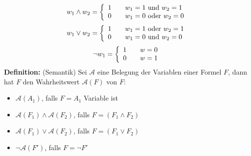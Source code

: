 \documentclass[a4paper]{scrartcl}
\begin{document}
\[ w_1 \wedge w_2 = \left\{
  \begin{array}{l l}
    1 & \quad \text{$w_1 = 1$ und $w_2 = 1$}\\
    0 & \quad \text{$w_1 = 0$ oder $w_2 = 0$}
  \end{array} \right.\]
\[ w_1 \vee w_2 = \left\{
  \begin{array}{l l}
    1 & \quad \text{$w_1 = 1$ oder $w_2 = 1$}\\
    0 & \quad \text{$w_1 = 0$ und $w_2 = 0$}
  \end{array} \right.\]
\[ \neg w_1 = \left\{
  \begin{array}{l l}
    1 & \quad \text{$w = 0$}\\
    0 & \quad \text{$w = 1$}
  \end{array} \right.\]
\textbf{Definition:} (Semantik) Sei $\mathcal{A}$ eine Belegung der Variablen einer Formel $F$, dann hat $F$ den Wahrheitswert $\mathcal{A}(F)$ von $F$:
\begin{itemize}
\item $\mathcal{A}(A_1)$, falls $F = A_1$ Variable ist
\item $\mathcal{A}(F_1) \wedge \mathcal{A}(F_2)$, falls $F = (F_1 \wedge F_2)$
\item $\mathcal{A}(F_1) \vee \mathcal{A}(F_2)$, falls $F = (F_1 \vee F_2)$
\item $\neg \mathcal{A}(F')$, falls $F = \neg F'$
\end{itemize}

\newpage
\end{document}

